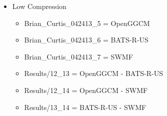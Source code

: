 \begin{itemize}
\begin{itemize}
\begin{itemize}
    \end{itemize}
    \item Low Compression
    \begin{itemize}
      \item Brian\_Curtis\_042413\_5 = OpenGGCM
      \item Brian\_Curtis\_042413\_6 = BATS-R-US
      \item Brian\_Curtis\_042413\_7 = SWMF
      \item Results/12\_13 = OpenGGCM - BATS-R-US
      \item Results/12\_14 = OpenGGCM - SWMF
      \item Results/13\_14 = BATS-R-US - SWMF
    \end{itemize}
  \end{itemize}
\end{itemize}
